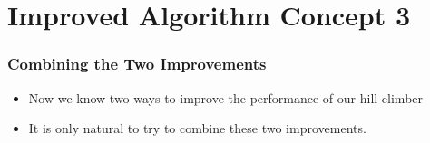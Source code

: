 \documentclass[mathserif]{beamer}%
\begin{document}
\section{Improved Algorithm Concept 3}%
%
\begin{frame}%
\frametitle{Combining the Two Improvements}%
\begin{itemize}%
\item Now we know two ways to improve the performance of our hill climber%
\item<4-> It is only natural to try to combine these two improvements.%
\end{itemize}%
\end{frame}%
%
\end{document}
